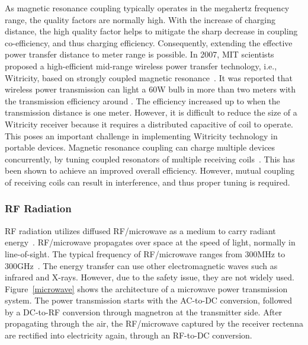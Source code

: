 \documentclass[twocolumn,10pt]{IEEEtran}
\begin{document}
As magnetic resonance coupling typically operates in the megahertz frequency range, the quality factors are normally high. With the increase of charging distance, the high quality factor helps to mitigate the sharp decrease in coupling co-efficiency, and thus charging efficiency. Consequently, extending the effective power transfer distance to meter range is possible. In 2007, MIT scientists proposed a high-efficient mid-range wireless power transfer technology, i.e., Witricity, based on strongly coupled magnetic resonance~\cite{Kurs2007A,witricity}. It was reported that wireless power transmission can light a 60W bulb in more than two meters with the transmission efficiency around . The efficiency increased up to  when the transmission distance is one meter. However, it is difficult to reduce the size of a Witricity receiver because it requires a distributed capacitive of coil to operate. This poses an important challenge in implementing Witricity technology in portable devices. Magnetic resonance coupling can charge multiple devices concurrently, by tuning coupled resonators of multiple receiving coils~\cite{A.2010Kurs}. This has been shown to achieve an improved overall efficiency. However, mutual coupling~\cite{G.2014Kim} of receiving coils can result in interference, and thus proper tuning is required.



\subsubsection{RF Radiation}

RF radiation utilizes diffused RF/microwave as a medium to carry radiant energy~\cite{2014X.Lu}. RF/microwave propagates over space at the speed of light, normally in line-of-sight. The typical frequency of RF/microwave ranges from 300MHz to 300GHz~\cite{X.LuIEEENetwork}. The energy transfer can use other electromagnetic waves such as infrared and X-rays. However, due to the safety issue, they are not widely used. Figure~\ref{microwave} shows the architecture of a microwave power transmission system. The power transmission starts with the AC-to-DC conversion, followed by a DC-to-RF conversion through magnetron at the transmitter side. After propagating through the air, the RF/microwave captured by the receiver rectenna are rectified into electricity again, through an RF-to-DC conversion.
\end{document}
